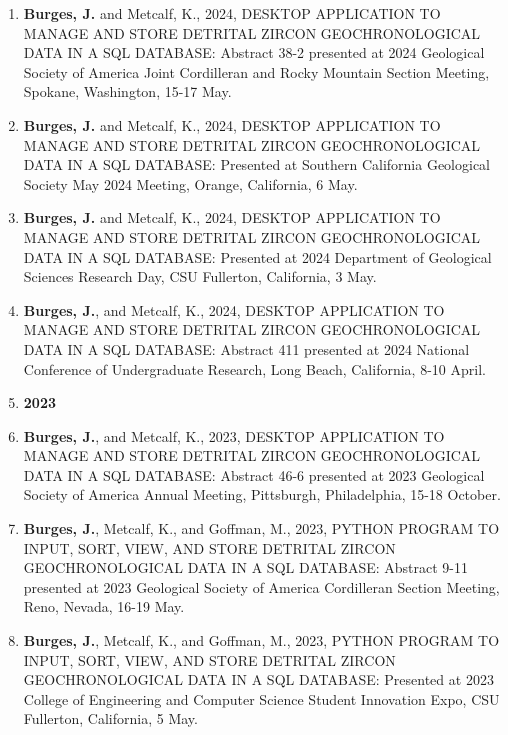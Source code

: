 \documentclass{res} %
\begin{document}
\begin{resume}
\begin{enumerate}
\item \textbf{Burges, J.} and Metcalf, K., 2024, DESKTOP APPLICATION TO MANAGE AND STORE DETRITAL ZIRCON GEOCHRONOLOGICAL DATA IN A SQL DATABASE: Abstract 38-2 presented at 2024 Geological Society of America Joint Cordilleran and Rocky Mountain Section Meeting, Spokane, Washington, 15-17 May.

\item \textbf{Burges, J.} and Metcalf, K., 2024, DESKTOP APPLICATION TO MANAGE AND STORE DETRITAL ZIRCON GEOCHRONOLOGICAL DATA IN A SQL DATABASE: Presented at Southern California Geological Society May 2024 Meeting, Orange, California, 6 May.

\item \textbf{Burges, J.} and Metcalf, K., 2024, DESKTOP APPLICATION TO MANAGE AND STORE DETRITAL ZIRCON GEOCHRONOLOGICAL DATA IN A SQL DATABASE: Presented at 2024 Department of Geological Sciences Research Day, CSU Fullerton, California, 3 May.

\item \textbf{Burges, J.}, and Metcalf, K., 2024, DESKTOP APPLICATION TO MANAGE AND STORE DETRITAL ZIRCON GEOCHRONOLOGICAL DATA IN A SQL DATABASE: Abstract 411 presented at 2024 National Conference of Undergraduate Research, Long Beach, California, 8-10 April.


\item[] \hspace*{-24pt}\textbf{\large 2023}

\item \textbf{Burges, J.}, and Metcalf, K., 2023, DESKTOP APPLICATION TO MANAGE AND STORE DETRITAL ZIRCON GEOCHRONOLOGICAL DATA IN A SQL DATABASE: Abstract 46-6 presented at 2023 Geological Society of America Annual Meeting, Pittsburgh, Philadelphia, 15-18 October.

\item \textbf{Burges, J.}, Metcalf, K., and Goffman, M., 2023, PYTHON PROGRAM TO INPUT, SORT, VIEW, AND STORE DETRITAL ZIRCON GEOCHRONOLOGICAL DATA IN A SQL DATABASE: Abstract 9-11 presented at 2023 Geological Society of America Cordilleran Section Meeting, Reno, Nevada, 16-19 May.

\item \textbf{Burges, J.}, Metcalf, K., and Goffman, M., 2023, PYTHON PROGRAM TO INPUT, SORT, VIEW, AND STORE DETRITAL ZIRCON GEOCHRONOLOGICAL DATA IN A SQL DATABASE: Presented at 2023 College of Engineering and Computer Science Student Innovation Expo, CSU Fullerton, California, 5 May.


\end{enumerate}
\end{resume}
\end{document}
